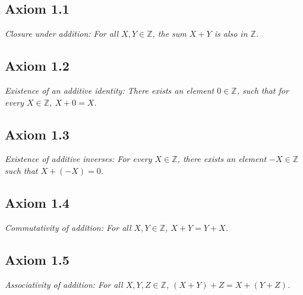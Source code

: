 \subsection{Axiom 1.1}
\textit{Closure under addition: For all \(X, Y \in \mathbb{Z}\), the sum \(X + Y\) is also in \(\mathbb{Z}\).}

\subsection{Axiom 1.2}
\textit{Existence of an additive identity: There exists an element \(0 \in \mathbb{Z}\), such that for every \(X \in \mathbb{Z}\), \(X + 0 = X\).}

\subsection{Axiom 1.3}
\textit{Existence of additive inverses: For every \(X \in \mathbb{Z}\), there exists an element \(-X \in \mathbb{Z}\) such that \(X + (-X) = 0\).}

\subsection{Axiom 1.4}
\textit{Commutativity of addition: For all \(X, Y \in \mathbb{Z}\), \(X + Y = Y + X\).}

\subsection{Axiom 1.5}
\textit{Associativity of addition: For all \(X, Y, Z \in \mathbb{Z}\), \((X + Y) + Z = X + (Y + Z)\).}
